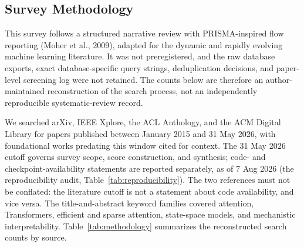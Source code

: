 \documentclass[10pt,twocolumn]{article}
\begin{document}
\subsection*{Survey Methodology}

This survey follows a structured narrative review with PRISMA-inspired flow reporting (Moher et al., 2009), adapted for the dynamic and rapidly evolving machine learning literature. It was not preregistered, and the raw database exports, exact database-specific query strings, deduplication decisions, and paper-level screening log were not retained. The counts below are therefore an author-maintained reconstruction of the search process, not an independently reproducible systematic-review record.

We searched arXiv, IEEE Xplore, the ACL Anthology, and the ACM Digital Library for papers published between January 2015 and 31 May 2026, with foundational works predating this window cited for context. The 31 May 2026 cutoff governs survey scope, score construction, and synthesis; code- and checkpoint-availability statements are reported separately, as of 7 Aug 2026 (the reproducibility audit, Table~\ref{tab:reproducibility}). The two references must not be conflated: the literature cutoff is not a statement about code availability, and vice versa. The title-and-abstract keyword families covered attention, Transformers, efficient and sparse attention, state-space models, and mechanistic interpretability. Table~\ref{tab:methodology} summarizes the reconstructed search counts by source.
\end{document}
